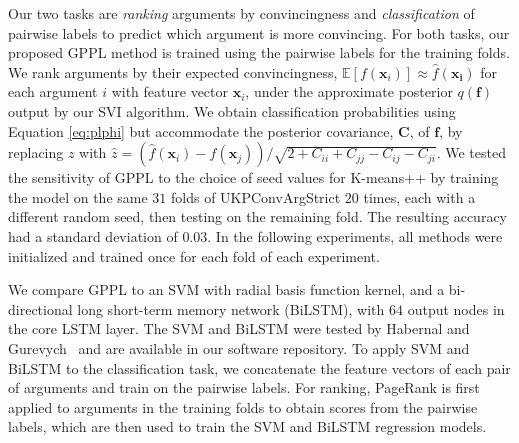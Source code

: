 Our two tasks are \emph{ranking} arguments by convincingness and  
\emph{classification} of pairwise labels to predict which argument is more convincing. 
For both tasks, our proposed GPPL method is trained using the pairwise labels for the training folds.
We rank arguments by their expected convincingness, $\mathbb{E}[f(\mathbf{x}_i)]\approx \hat{f}(\mathbf {x_i})$ for each argument $i$ with feature vector $\mathbf{x}_i$, under the approximate posterior $q(\mathbf f)$
output by our SVI algorithm.
We obtain classification probabilities using Equation \ref{eq:plphi} but 
accommodate the posterior covariance, $\mathbf C$, of $\mathbf f$, by replacing $z$ with $\hat{z} = (\hat{f}(\mathbf x_i) - \hat{f}(\mathbf x_j)) / \sqrt{2 + C_{ii} + C_{jj} - C_{ij} - C_{ji}}$.
We tested the sensitivity of GPPL to the choice of seed values for K-means++ by training the model on the same $31$ folds of UKPConvArgStrict $20$ times, each with a different random seed, then testing on the remaining fold.
The resulting accuracy had a standard deviation of $0.03$. 
In the following experiments, all methods were initialized and trained once for each fold of each experiment.

We compare GPPL to an SVM with radial basis function kernel, 
and a bi-directional long short-term memory network (BiLSTM),
with $64$ output nodes in the core LSTM layer. 
The SVM and BiLSTM were tested by Habernal and Gurevych~ and are available in our software repository.
To apply SVM and BiLSTM to the classification task, we concatenate the feature vectors of each pair of arguments and train on the pairwise labels.
For ranking, PageRank is first applied to arguments in the training folds to obtain scores from the pairwise labels,
which are then used to train the SVM and BiLSTM regression models.


